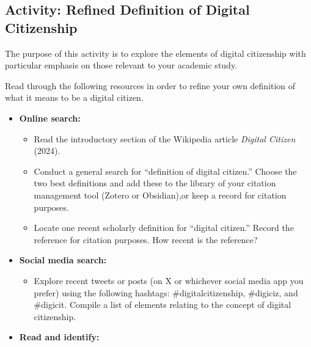 \documentclass[
  letterpaper,
  DIV=11,
  numbers=noendperiod]{scrreprt}
\providecommand{\tightlist}{%
  \setlength{\itemsep}{0pt}\setlength{\parskip}{0pt}}\usepackage{longtable,booktabs,array}
\begin{document}
\subsection{Activity: Refined Definition of Digital
Citizenship}\label{activity-refined-definition-of-digital-citizenship}

\begin{tcolorbox}[enhanced jigsaw, toprule=.15mm, colback=white, colframe=quarto-callout-note-color-frame, bottomtitle=1mm, leftrule=.75mm, coltitle=black, titlerule=0mm, rightrule=.15mm, colbacktitle=quarto-callout-note-color!10!white, left=2mm, title={Learning Activity}, opacitybacktitle=0.6, opacityback=0, breakable, toptitle=1mm, arc=.35mm, bottomrule=.15mm]

The purpose of this activity is to explore the elements of digital
citizenship with particular emphasis on those relevant to your academic
study.

Read through the following resources in order to refine your own
definition of what it means to be a digital citizen.

\begin{itemize}
\tightlist
\item
  \textbf{Online search:}

  \begin{itemize}
  \tightlist
  \item
    Read the introductory section of the Wikipedia article \emph{Digital
    Citizen} (2024).
  \item
    Conduct a general search for ``definition of digital citizen.''
    Choose the two best definitions and add these to the library of your
    citation management tool (Zotero or Obsidian),or keep a record for
    citation purposes.
  \item
    Locate one recent scholarly definition for ``digital citizen.''
    Record the reference for citation purposes. How recent is the
    reference?
  \end{itemize}
\item
  \textbf{Social media search:}

  \begin{itemize}
  \tightlist
  \item
    Explore recent tweets or posts (on X or whichever social media app
    you prefer) using the following hashtags: \#digitalcitizenship,
    \#digiciz, and \#digicit. Compile a list of elements relating to the
    concept of digital citizenship.
  \end{itemize}
\item
  \textbf{Read and identify:}


\end{itemize}
\end{tcolorbox}
\end{document}
